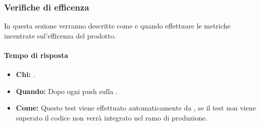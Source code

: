 \subsubsection{Verifiche di efficenza}
In questa sezione verranno descritte come e quando effettuare le metriche incentrate sul'efficenza del prodotto.

\paragraph{Tempo di risposta}
\begin{itemize}
\item \textbf{Chi:} .
\item \textbf{Quando:} Dopo ogni push sulla .
\item \textbf{Come:} Questo test viene effettuato automaticamente da , se il test non viene superato il codice non verrà integrato nel ramo di produzione.
\end{itemize}
